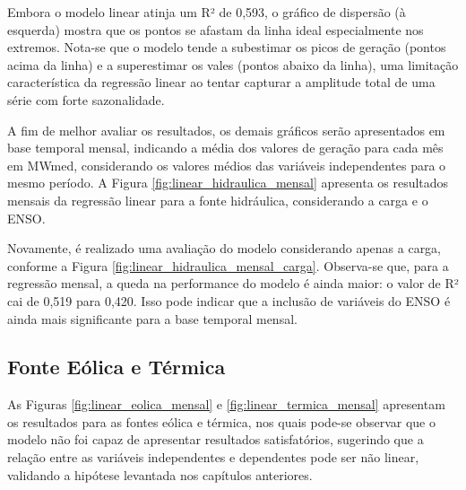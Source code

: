 \begin{figure}[!ht]
  {}
  {}
\end{figure}

Embora o modelo linear atinja um R² de 0,593, o gráfico de dispersão (à esquerda) mostra que os pontos se 
afastam da linha ideal especialmente nos extremos. Nota-se que o modelo tende a subestimar os picos de geração 
(pontos acima da linha) e a superestimar os vales (pontos abaixo da linha), uma limitação característica da regressão 
linear ao tentar capturar a amplitude total de uma série com forte sazonalidade.

A fim de melhor avaliar os resultados, os demais gráficos serão apresentados em base temporal mensal, indicando a média 
dos valores de geração para cada mês em MWmed, considerando os valores médios das variáveis independentes para o mesmo período. 
A Figura \ref{fig:linear_hidraulica_mensal} apresenta os resultados mensais da regressão linear para a fonte hidráulica, 
considerando a carga e o ENSO. 

\begin{figure}[!ht]
  {}
  {}
\end{figure}
\begin{figure}[!ht]
  {}
  {}
\end{figure}

Novamente, é realizado uma avaliação do modelo considerando apenas a carga, conforme a Figura 
\ref{fig:linear_hidraulica_mensal_carga}. Observa-se que, para a regressão mensal, a queda na performance do modelo é ainda
maior: o valor de R² cai de 0,519 para 0,420. Isso pode indicar que a inclusão de variáveis do ENSO é ainda mais significante 
para a base temporal mensal.

\subsection{Fonte Eólica e Térmica}
As Figuras \ref{fig:linear_eolica_mensal} e \ref{fig:linear_termica_mensal} apresentam os resultados para as fontes eólica 
e térmica, nos quais pode-se observar que o modelo não foi capaz de apresentar resultados satisfatórios, sugerindo
que a relação entre as variáveis independentes e dependentes pode ser não linear, validando a hipótese levantada nos capítulos
anteriores.

